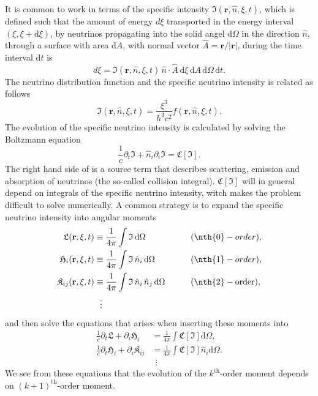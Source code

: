 It is common to work in terms of the specific intensity $\mathfrak{I}(\mathbf{r},\hat{n},\xi,t)$,
which is defined such that the amount of energy $d\xi$ transported in the energy interval
$(\xi,\xi+\mathrm{d}\xi)$, by neutrinos propagating into 
the solid angel $\mathrm{d}\Omega$ in the direction $\hat{n}$,
through a surface with area $\mathrm{d}A$, with normal vector $\hat{A} = \mathbf{r}/|\mathbf{r}|$, 
during the time interval $\mathrm{d}t$ is
\begin{equation} \label{eqN:intns}
d \xi = \mathfrak{I}(\mathbf{r},\hat{n},\xi,t) \, \hat{n} \cdot \hat{A}
\, \mathrm{d}\xi \, \mathrm{d}A \, \mathrm{d}\Omega \, \mathrm{d}t.
\end{equation}
The neutrino distribution function and the specific neutrino intensity is related as follows
\begin{equation}
\mathfrak{I}(\mathbf{r},\hat{n},\xi,t) = \frac{\xi^3}{h^3 c^2} f(\mathbf{r},\hat{n},\xi,t).
\end{equation}
The evolution of the specific neutrino intensity is calculated by solving the Boltzmann equation
\begin{equation} \label{eqN:boltz}
\frac{1}{c} \partial_t \mathfrak{I} + \hat{n}_i \partial_i \mathfrak{I} = \mathfrak{C} [\mathfrak{I}].
\end{equation}
The right hand side of  is a source term that describes scattering, emission and absorption
of neutrinos (the so-called collision integral). $\mathfrak{C} [\mathfrak{I}]$ will in general depend on integrals of the specific neutrino intensity, witch makes the problem difficult to solve numerically. 
A common strategy is to expand the specific neutrino intensity into angular moments
\begin{alignat}{2}
\mathfrak{L}(\mathbf{r},\xi,t) &\equiv  \frac{1}{4\pi} \int \mathfrak{I} \, \mathrm{d} \Omega &&\qquad (\nth{0}-order), \\ 
\mathfrak{H}_i(\mathbf{r},\xi,t) &\equiv  \frac{1}{4\pi} \int \mathfrak{I} \, \hat{n}_i \, \mathrm{d} \Omega &&\qquad (\nth{1}-order), \\
\mathfrak{K}_{ij}(\mathbf{r},\xi,t) &\equiv  \frac{1}{4\pi} \int \mathfrak{I} \, \hat{n}_i \, \hat{n}_j \, \mathrm{d} \Omega &&\qquad (\nth{2}-\text{order}), \\
& \ \ \vdots && \nonumber
\end{alignat}
and then solve the equations that arises when inserting these moments into 
\begin{align}
\frac{1}{c} \partial_t \mathfrak{L} +  \partial_i \mathfrak{H}_i &= \frac{1}{4\pi} \int \mathfrak{C} [\mathfrak{I}] \mathrm{d} \Omega, \\
\frac{1}{c} \partial_t \mathfrak{H}_i + \partial_i \mathfrak{K}_{ij} &= \frac{1}{4\pi} \int \mathfrak{C} [\mathfrak{I}] \hat{n}_i \mathrm{d} \Omega. \\
& \ \ \vdots \nonumber
\end{align}
We see from these equations that the evolution of the $k^{\text{th}}$-order moment depends on $(k+1)^{\text{th}}$-order moment.

